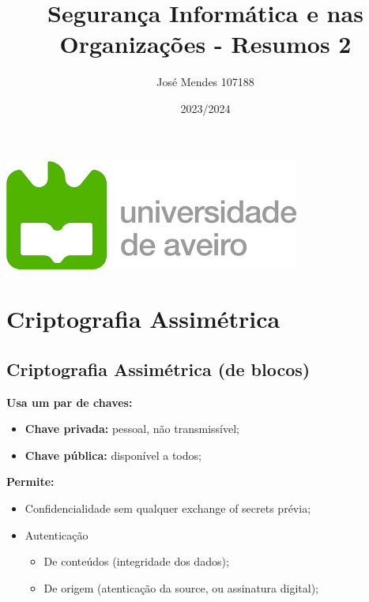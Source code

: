 \documentclass{article}
\title{Segurança Informática e nas Organizações - Resumos 2}
\author{José Mendes 107188}
\date{2023/2024}
\begin{document}
\begin{titlepage}
    \maketitle
    \begin{center}
        \includegraphics[scale=0.4]{UA.png}
    \end{center}
    \thispagestyle{empty} %
\end{titlepage}

\pagebreak

\section{Criptografia Assimétrica}

\subsection{Criptografia Assimétrica (de blocos)}

\begin{flushleft}
  \textbf{Usa um par de chaves:}
  \begin{itemize}
    \item \textbf{Chave privada:} pessoal, não transmissível;
    \item \textbf{Chave pública:} disponível a todos;
  \end{itemize}

  \vspace{2mm}

  \textbf{Permite:}
  \begin{itemize}
    \item Confidencialidade sem qualquer exchange of secrets prévia;
    \item Autenticação
    \begin{itemize}
      \item De conteúdos (integridade dos dados);
      \item De origem (atenticação da source, ou assinatura digital);
    \end{itemize}
  \end{itemize}
\end{flushleft}
\end{document}
